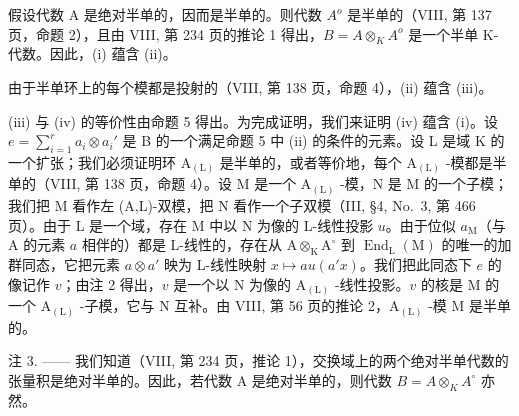假设代数 A 是绝对半单的，因而是半单的。则代数 \(A^{o}\) 是半单的（VIII, 第 137 页，命题 2），且由 VIII, 第 234 页的推论 1 得出，\(B = A \otimes_{K} A^{o}\) 是一个半单 K-代数。因此，(i) 蕴含 (ii)。

由于半单环上的每个模都是投射的（VIII, 第 138 页，命题 4），(ii) 蕴含 (iii)。

(iii) 与 (iv) 的等价性由命题 5 得出。为完成证明，我们来证明 (iv) 蕴含 (i)。设 \(e = \sum_{i=1}^{r} a_i \otimes a_i'\) 是 B 的一个满足命题 5 中 (ii) 的条件的元素。设 L 是域 K 的一个扩张；我们必须证明环 \(\mathrm{A}_{(\mathrm{L})}\) 是半单的，或者等价地，每个 \(\mathrm{A}_{(\mathrm{L})}\) -模都是半单的（VIII, 第 138 页，命题 4）。设 M 是一个 \(\mathrm{A}_{(\mathrm{L})}\) -模，N 是 M 的一个子模；我们把 M 看作左 (A,L)-双模，把 N 看作一个子双模（III, §4, No.~3, 第 466 页）。由于 L 是一个域，存在 M 中以 N 为像的 L-线性投影 \(u\)。由于位似 \(a_{\mathrm{M}}\)（与 A 的元素 \(a\) 相伴的）都是 L-线性的，存在从 \(\mathrm{A} \otimes_{\mathrm{K}} \mathrm{A}^{\circ}\) 到 \(\operatorname{End}_{\mathrm{L}}(\mathrm{M})\) 的唯一的加群同态，它把元素 \(a \otimes a'\) 映为 L-线性映射 \(x \mapsto au(a'x)\)。我们把此同态下 \(e\) 的像记作 \(v\)；由注 2 得出，\(v\) 是一个以 N 为像的 \(\mathrm{A}_{(\mathrm{L})}\) -线性投影。\(v\) 的核是 M 的一个 \(\mathrm{A}_{(\mathrm{L})}\) -子模，它与 N 互补。由 VIII, 第 56 页的推论 2，\(\mathrm{A}_{(\mathrm{L})}\) -模 M 是半单的。

注 3. —— 我们知道（VIII, 第 234 页，推论 1），交换域上的两个绝对半单代数的张量积是绝对半单的。因此，若代数 A 是绝对半单的，则代数 \(B = A \otimes_{K} A^{\circ}\) 亦然。

